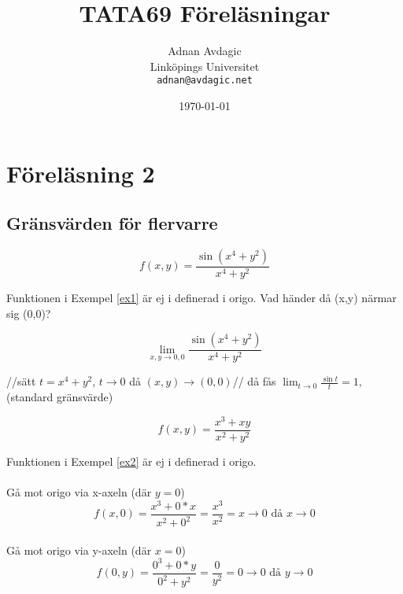 \documentclass{article}
\begin{document}
\title{TATA69 Föreläsningar}
\author{Adnan Avdagic\\
	Linköpings Universitet\\
	\texttt{adnan@avdagic.net}}
\date{\today}
\maketitle

\newpage


\section{Föreläsning 2}
\subsection{Gränsvärden för flervarre}

\begin{equation} \label{ex1}
	f(x,y) = \frac{\sin(x^4+y^2)}{x^4+y^2}
\end{equation}

Funktionen i Exempel \ref{ex1} är ej i definerad i origo.
Vad händer då (x,y) närmar sig (0,0)?

$$\lim_{x,y \rightarrow 0,0} \frac{\sin(x^4+y^2)}{x^4+y^2}$$

//sätt $t= \displaystyle x^4+y^2$, ${t \rightarrow 0}$ då ${(x,y) \rightarrow (0,0)}$// \newline
då fås \(\displaystyle \lim_{t \rightarrow 0} \frac{\sin t}{t} = 1,\) (standard gränsvärde) \newline

\begin{equation} \label{ex2}
	f(x,y) = \frac{x^3+xy}{x^2+y^2}
\end{equation}

Funktionen i Exempel \ref{ex2} är ej i definerad i origo.

\paragraph{}
Gå mot origo via x-axeln (där $y=0$)
$$f(x,0) = \frac{x^3+0*x}{x^2+0^2} = \frac{x^3}{x^2} =  {x \rightarrow 0} \text{ då } {x \rightarrow 0}$$

\paragraph{}
Gå mot origo via y-axeln (där $x=0$)
$$f(0,y) = \frac{0^3+0*y}{0^2+y^2} = \frac{0}{y^2} =  {0 \rightarrow 0} \text{ då } {y \rightarrow 0}$$
\end{document}
